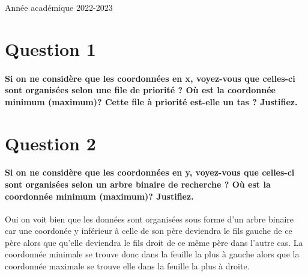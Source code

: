 \documentclass{article}
\begin{document}
\begin{titlepage}
\begin{center}
        {\large Année académique 2022-2023}
        
    \end{center}
\end{titlepage}

\tableofcontents

\newpage

\section{Question 1}
    \paragraph{Si on ne considère que les coordonnées en x, voyez-vous que celles-ci sont organisées selon une file de priorité ?
    Où est la coordonnée minimum (maximum)? Cette file à priorité est-elle un tas ? Justifiez.}

\section{Question 2}
    \paragraph{Si on ne considère que les coordonnées en y, voyez-vous que celles-ci sont organisées selon un arbre binaire de recherche ?  Où est la coordonnée minimum (maximum)? Justifiez.} 
    Oui on voit bien que les données sont organisées sous forme d'un arbre binaire car une coordonée y inférieur à celle de son père
    deviendra le fils gauche de ce père alors que qu'elle deviendra le fils droit de ce même père dans l'autre cas. La coordonnée minimale se trouve donc dans la feuille la plus à gauche 
    alors que la coordonnée maximale se trouve elle dans la feuille la plus à droite.
\end{document}
